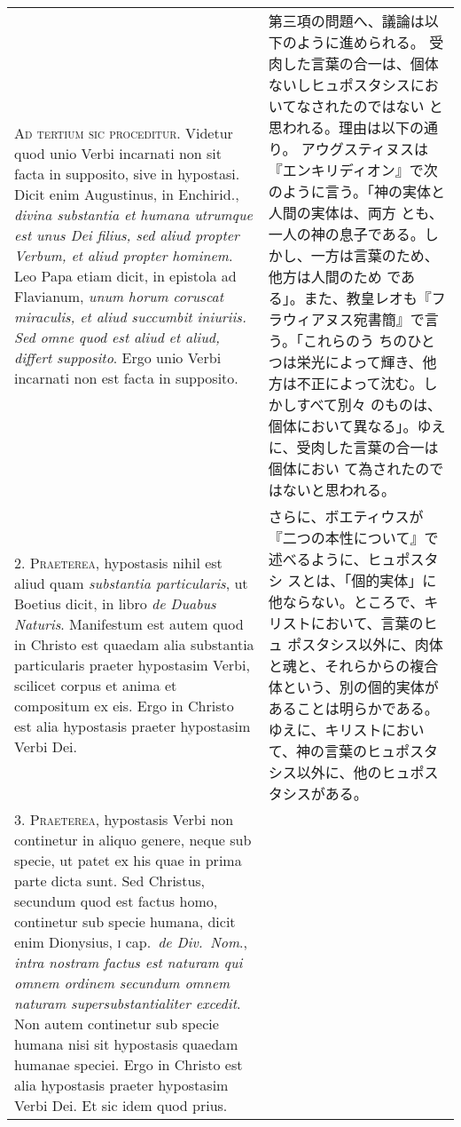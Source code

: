 \documentclass[10pt]{jsarticle} %
\begin{document}
\begin{longtable}{p{21em}p{21em}}



{\Huge A}{\scshape d tertium sic proceditur}. Videtur quod unio Verbi incarnati non sit
facta in supposito, sive in hypostasi. Dicit enim Augustinus, in
Enchirid., {\itshape divina substantia et humana utrumque est unus Dei filius, sed
aliud propter Verbum, et aliud propter hominem}. Leo Papa etiam dicit, in
epistola ad Flavianum, {\itshape unum horum coruscat miraculis, et aliud succumbit
iniuriis. Sed omne quod est aliud et aliud, differt supposito}. Ergo unio
Verbi incarnati non est facta in supposito.

&

第三項の問題へ、議論は以下のように進められる。
受肉した言葉の合一は、個体ないしヒュポスタシスにおいてなされたのではない
 と思われる。理由は以下の通り。
アウグスティヌスは『エンキリディオン』で次のように言う。「神の実体と人間の実体は、両方
 とも、一人の神の息子である。しかし、一方は言葉のため、他方は人間のため
 である」。また、教皇レオも『フラウィアヌス宛書簡』で言う。「これらのう
 ちのひとつは栄光によって輝き、他方は不正によって沈む。しかしすべて別々
 のものは、個体において異なる」。ゆえに、受肉した言葉の合一は個体におい
 て為されたのではないと思われる。


\\



2. {\scshape Praeterea}, hypostasis nihil est aliud quam {\itshape substantia particularis}, ut
Boetius dicit, in libro {\itshape de Duabus Naturis}. Manifestum est autem quod in
Christo est quaedam alia substantia particularis praeter hypostasim
Verbi, scilicet corpus et anima et compositum ex eis. Ergo in Christo
est alia hypostasis praeter hypostasim Verbi Dei.

&

さらに、ボエティウスが『二つの本性について』で述べるように、ヒュポスタシ
 スとは、「個的実体」に他ならない。ところで、キリストにおいて、言葉のヒュ
 ポスタシス以外に、肉体と魂と、それらからの複合体という、別の個的実体が
 あることは明らかである。ゆえに、キリストにおいて、神の言葉のヒュポスタ
 シス以外に、他のヒュポスタシスがある。


\\



3. {\scshape Praeterea}, hypostasis Verbi non continetur in aliquo genere, neque sub
specie, ut patet ex his quae in prima parte dicta sunt. Sed Christus,
secundum quod est factus homo, continetur sub specie humana, dicit enim
Dionysius, {\scshape i} cap.~{\itshape de Div.~Nom}., {\itshape intra nostram factus est naturam qui
omnem ordinem secundum omnem naturam supersubstantialiter excedit}. Non
autem continetur sub specie humana nisi sit hypostasis quaedam humanae
speciei. Ergo in Christo est alia hypostasis praeter hypostasim Verbi
Dei. Et sic idem quod prius.


\end{longtable}
\end{document}

